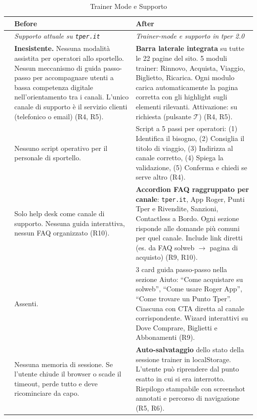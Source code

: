 \begin{table}[H]
\centering
\small
\renewcommand{\arraystretch}{1.4}
\begin{tabular}{|p{0.5cm}|p{7cm}|p{7cm}|}
\hline
& \textbf{Before} & \textbf{After} \\ \hline
\cellcolor{primaryColor!15} &
\textit{Supporto attuale su \texttt{tper.it}} &
\textit{Trainer-mode e supporto in tper 2.0} \\ \hline

\raisebox{0.5cm}{\rotatebox{90}{\textbf{Trainer}}} &
\textbf{Inesistente.} Nessuna modalità assistita per operatori allo sportello. Nessun meccanismo di guida passo-passo per accompagnare utenti a bassa competenza digitale nell'orientamento tra i canali. L'unico canale di supporto è il servizio clienti (telefonico o email) (R4, R5). &
\textbf{Barra laterale integrata} su tutte le 22 pagine del sito. 5 moduli trainer: Rinnovo, Acquista, Viaggio, Biglietto, Ricarica. Ogni modulo carica automaticamente la pagina corretta con gli highlight sugli elementi rilevanti. Attivazione: su richiesta (pulsante $\mathcal{T}$) (R4, R5). \\ \hline

\raisebox{0.5cm}{\rotatebox{90}{\textbf{Script}}} &
Nessuno script operativo per il personale di sportello. &
Script a 5 passi per operatori: (1) Identifica il bisogno, (2) Consiglia il titolo di viaggio, (3) Indirizza al canale corretto, (4) Spiega la validazione, (5) Conferma e chiedi se serve altro (R4). \\ \hline

\raisebox{0.5cm}{\rotatebox{90}{\textbf{FAQ}}} &
Solo help desk come canale di supporto. Nessuna guida interattiva, nessun FAQ organizzato (R10). &
\textbf{Accordion FAQ raggruppato per canale}: \texttt{tper.it}, App Roger, Punti Tper e Rivendite, Sanzioni, Contactless a Bordo. Ogni sezione risponde alle domande più comuni per quel canale. Include link diretti (es. da FAQ solweb $\rightarrow$ pagina di acquisto) (R9, R10). \\ \hline

\raisebox{0.5cm}{\rotatebox{90}{\textbf{Guide}}} &
Assenti. &
3 card guida passo-passo nella sezione Aiuto: ``Come acquistare su solweb'', ``Come usare Roger App'', ``Come trovare un Punto Tper''. Ciascuna con CTA diretta al canale corrispondente. Wizard interattivi su Dove Comprare, Biglietti e Abbonamenti (R9). \\ \hline

\raisebox{0.5cm}{\rotatebox{90}{\textbf{Persistenza}}} &
Nessuna memoria di sessione. Se l'utente chiude il browser o scade il timeout, perde tutto e deve ricominciare da capo. &
\textbf{Auto-salvataggio} dello stato della sessione trainer in localStorage. L'utente può riprendere dal punto esatto in cui si era interrotto. Riepilogo stampabile con screenshot annotati e percorso di navigazione (R5, R6). \\ \hline
\end{tabular}
\caption{Trainer Mode e Supporto}
\label{tab:comparison-trainer}
\end{table}

